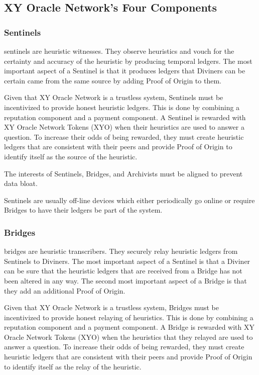 \documentclass{article}
\begin{document}
\subsection {XY Oracle Network's Four Components}

\subsubsection {Sentinels}
\Glspl{sentinel} are heuristic witnesses.  They observe heuristics and vouch for the certainty and accuracy of the heuristic by producing temporal ledgers. The most important aspect of a Sentinel is that it produces ledgers that Diviners can be certain came from the same source by adding Proof of Origin to them.

Given that XY Oracle Network is a trustless system, Sentinels must be incentivized to provide honest heuristic ledgers.  This is done by combining a reputation component and a payment component.  A Sentinel is rewarded with XY Oracle Network Tokens (XYO) when their heuristics are used to answer a question.  To increase their odds of being rewarded, they must create heuristic ledgers that are consistent with their peers and provide Proof of Origin to identify itself as the source of the heuristic.

The interests of Sentinels, Bridges, and Archivists must be aligned to prevent data bloat.

Sentinels are usually off-line devices which either periodically go online or require Bridges to have their ledgers be part of the system.

\subsubsection {Bridges}
\Glspl{bridge} are heuristic transcribers.  They securely relay heuristic ledgers from Sentinels to Diviners.  The most important aspect of a Sentinel is that a Diviner can be sure that the heuristic ledgers that are received from a Bridge has not been altered in any way.  The second most important aspect of a Bridge is that they add an additional Proof of Origin.

Given that XY Oracle Network is a trustless system, Bridges must be incentivized to provide honest relaying of heuristics.  This is done by combining a reputation component and a payment component.  A Bridge is rewarded with XY Oracle Network Tokens (XYO) when the heuristics that they relayed are used to answer a question.  To increase their odds of being rewarded, they must create heuristic ledgers that are consistent with their peers and provide Proof of Origin to identify itself as the relay of the heuristic.
\end{document}
